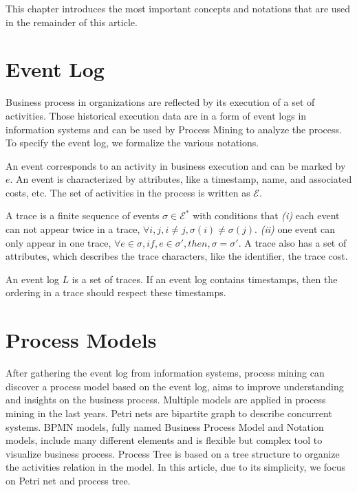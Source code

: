 This chapter introduces the most important concepts and notations that are used in the remainder of this article. 
\section{Event Log}
Business process in organizations are reflected by its execution of a set of activities. Those historical execution data are in a form of event logs in information systems and can be used by Process Mining to analyze the process. To specify the event log, we formalize the various notations\cite{van2016data}.
\begin{definition}[Event]
	An event corresponds to an activity in business execution and can be marked by $e$. An event is characterized by attributes, like a timestamp, name, and associated costs, etc. The set of activities in the process is written as $\mathcal{E}$.
\end{definition}
\begin{definition}[Trace]
A trace is a finite sequence of events $\sigma \in \mathcal{E}^*$ with conditions that \emph{(i)} each event can not appear twice in a trace, $ \forall i,j, i \neq j, \sigma (i) \neq \sigma (j) $.  \emph{(ii)} one event can only appear in one trace, $ \forall e \in \sigma, if,  e \in \sigma\prime, then,  \sigma = \sigma\prime $. 
A trace also has a set of attributes, which describes the trace characters, like the identifier, the trace cost.
\end{definition}
\begin{definition}
An event log $L$ is a set of traces. If an event log contains timestamps, then the ordering in a trace should respect these timestamps. 
\end{definition}

\section{Process Models}
After gathering the event log from information systems, process mining can discover a process model based on the event log, aims to improve understanding and insights on the business process. Multiple models are applied in process mining in the last years. Petri nets are bipartite graph to describe concurrent systems. BPMN models, fully named Business Process Model and Notation models, include many different elements and is flexible but complex tool to visualize business process. Process Tree is based on a tree structure to organize the activities relation in the model. In this article, due to its simplicity, we focus on Petri net and process tree.
